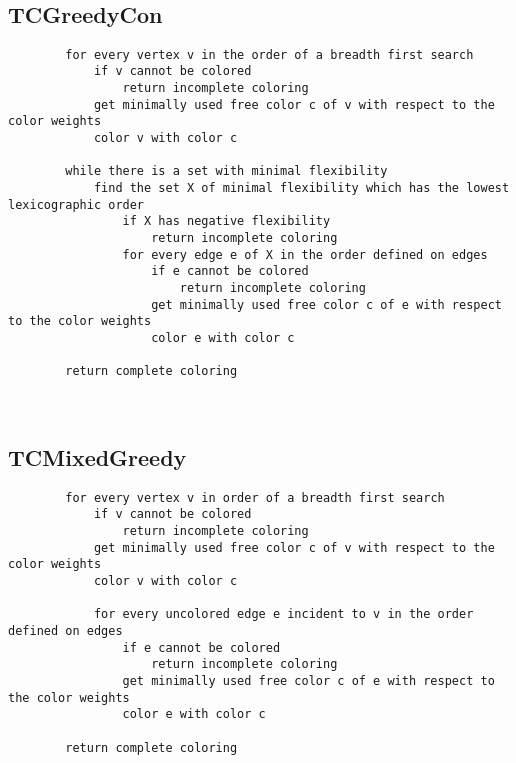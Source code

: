 \documentclass{article}
\begin{document}
	~\newpage
	
	\subsection{TCGreedyCon}
	\begin{verbatim}
		for every vertex v in the order of a breadth first search
		    if v cannot be colored
		        return incomplete coloring
		    get minimally used free color c of v with respect to the color weights
		    color v with color c
				    
		while there is a set with minimal flexibility
		    find the set X of minimal flexibility which has the lowest lexicographic order
		        if X has negative flexibility
		            return incomplete coloring
		        for every edge e of X in the order defined on edges
		            if e cannot be colored
		                return incomplete coloring
		            get minimally used free color c of e with respect to the color weights
		            color e with color c
				        
		return complete coloring
	\end{verbatim}	
	
	
	~\newpage
	
	\subsection{TCMixedGreedy}
	\begin{verbatim}
		for every vertex v in order of a breadth first search
		    if v cannot be colored
		        return incomplete coloring
		    get minimally used free color c of v with respect to the color weights
		    color v with color c
				    
		    for every uncolored edge e incident to v in the order defined on edges
		        if e cannot be colored
		            return incomplete coloring
		        get minimally used free color c of e with respect to the color weights
		        color e with color c
				        
		return complete coloring
	\end{verbatim}
			
	~\newpage
	
\end{document}
